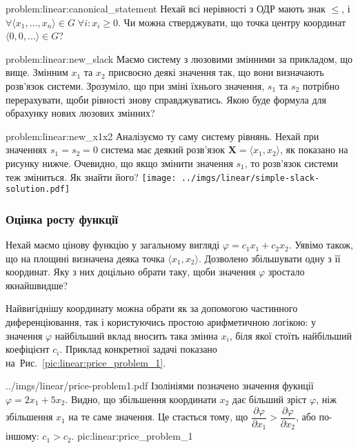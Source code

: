 \documentclass[\main/book.tex]{subfiles}
\begin{document}
\begin{problem}{problem:linear:canonical_statement}
 Нехай всі нерівності з ОДР мають знак \flqq{}$\leq$\frqq{}, і $\forall \langle x_1, \ldots, x_n \rangle \in G \; \forall i: x_i \geq 0$. Чи можна стверджувати, що точка центру координат $\langle 0, 0, \ldots \rangle \in G$?
\end{problem}

\begin{problem}{problem:linear:new_slack}
 Маємо систему з люзовими змінними за прикладом, що вище. Змінним $x_1$ та $x_2$ присвоєно деякі значення так, що вони визначають розв'язок системи. Зрозуміло, що при зміні їхнього значення, $s_1$ та $s_2$ потрібно перерахувати, щоби рівності знову справджуватись. Якою буде формула для обрахунку нових люзових змінних?
\end{problem}

\begin{problem}{problem:linear:new_x1x2}
 Аналізуємо ту саму систему рівнянь. Нехай при значеннях $s_1 = s_2 = 0$ система має деякий розв'язок $\mathbf{X} = \langle x_1, x_2 \rangle$, як показано на рисунку нижче. Очевидно, що якщо змінити значення $s_1$, то розв'язок системи теж зміниться. Як знайти його?
 \center
 \texttt{[image: ../imgs/linear/simple-slack-solution.pdf]}
\end{problem}

\subsubsection{Оцінка росту функції}
\label{section:linear:phi_increase_evaluation}

Нехай маємо цінову функцію у загальному вигляді $\varphi = c_1 x_1 + c_2 x_2$. Уявімо також, що на площині визначена деяка точка ${\langle x_1, x_2 \rangle}$. Дозволено збільшувати одну з її координат. Яку з них доцільно обрати таку, щоби значення $\varphi$ зростало якнайшвидше?

\flqq{}Найвигіднішу\frqq{} координату можна обрати як за допомогою частинного диференціювання, так і користуючись простою арифметичною логікою: у значення $\varphi$ найбільший вклад вносить така змінна $x_i$, біля якої стоїть найбільший коефіцієнт $c_i$. Приклад конкретної задачі показано на~Рис.~\ref{pic:linear:price_problem_1}.

\illustration
 {../imgs/linear/price-problem1.pdf}
 {Ізолініями позначено значення фукнції $\varphi = 2 x_1 + 5 x_2$. Видно, що збільшення координати $x_2$ дає більший зріст $\varphi$, ніж збільшення $x_1$ на те саме значення. Це стається тому, що $\dfrac{\partial\varphi}{\partial x_1} > \dfrac{\partial\varphi}{\partial x_2}$, або по-іншому: $c_1 > c_2$.}
 {pic:linear:price_problem_1}
\end{document}
